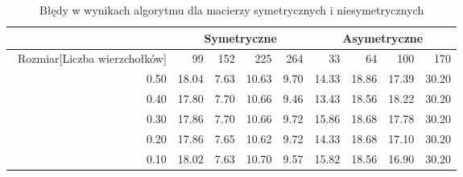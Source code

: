 \begin{table}
\begin{tabular}{|r|r|r|r|r|r|r|r|r|}
\hline
 & \multicolumn{4}{|c|}{Symetryczne} & \multicolumn{4}{|c|}{Asymetryczne} \\ \hline\
Rozmiar[Liczba wierzchołków] & 99 & 152 & 225 & 264 & 33 & 64 & 100 & 170 \\ \hline
0.50 & 18.04 & 7.63 & 10.63 & 9.70 & 14.33 & 18.86 & 17.39 & 30.20 \\
0.40 & 17.80 & 7.70 & 10.66 & 9.46 & 13.43 & 18.56 & 18.22 & 30.20 \\
0.30 & 17.86 & 7.70 & 10.66 & 9.72 & 15.86 & 18.68 & 17.78 & 30.20 \\
0.20 & 17.86 & 7.65 & 10.62 & 9.72 & 14.33 & 18.68 & 17.10 & 30.20 \\
0.10 & 18.02 & 7.63 & 10.70 & 9.57 & 15.82 & 18.56 & 16.90 & 30.20 \\ \hline
\end{tabular}
\caption{Błędy w wynikach algorytmu dla macierzy symetrycznych i niesymetrycznych}
\label{tab:error_TsTabuLen}
\end{table}
